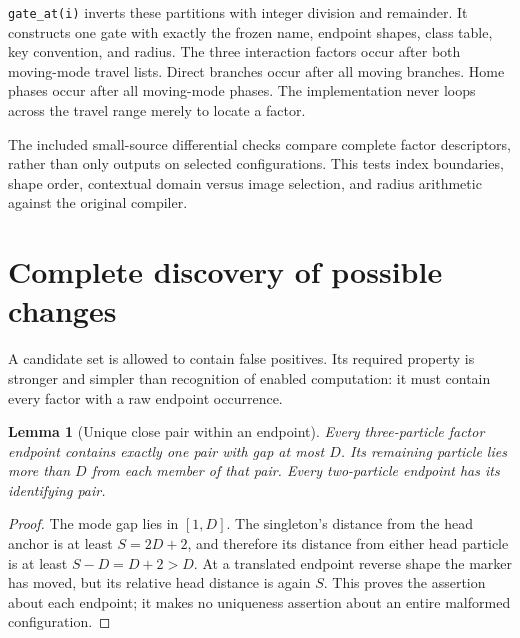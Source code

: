 \documentclass[11pt,a4paper]{article}
\numberwithin{equation}{section}
\newtheorem{lemma}[theorem]{Lemma}
\begin{document}
\texttt{gate\_at(i)} inverts these partitions with integer division and remainder. It constructs one gate with exactly the frozen name, endpoint shapes, class table, key convention, and radius. The three interaction factors occur after both moving-mode travel lists. Direct branches occur after all moving branches. Home phases occur after all moving-mode phases. The implementation never loops across the travel range merely to locate a factor.

The included small-source differential checks compare complete factor descriptors, rather than only outputs on selected configurations. This tests index boundaries, shape order, contextual domain versus image selection, and radius arithmetic against the original compiler.

\section{Complete discovery of possible changes}\label{fpa:lz:sec:candidates}
A candidate set is allowed to contain false positives. Its required property is stronger and simpler than recognition of enabled computation: it must contain every factor with a raw endpoint occurrence.

\begin{lemma}[Unique close pair within an endpoint]
Every three-particle factor endpoint contains exactly one pair with gap at most $D$. Its remaining particle lies more than $D$ from each member of that pair. Every two-particle endpoint has its identifying pair.
\end{lemma}
\begin{proof}
The mode gap lies in $[1,D]$. The singleton's distance from the head anchor is at least $S=2D+2$, and therefore its distance from either head particle is at least $S-D=D+2>D$. At a translated endpoint reverse shape the marker has moved, but its relative head distance is again $S$. This proves the assertion about each endpoint; it makes no uniqueness assertion about an entire malformed configuration.
\end{proof}
\end{document}
